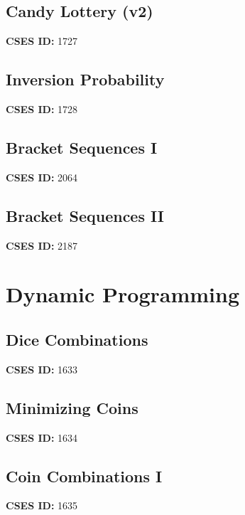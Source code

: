\documentclass[10pt, a4paper, twocolumn, landscape]{article}
\begin{document}
\subsection{Candy Lottery (v2)}
\textbf{CSES ID:} 1727 \\

\vspace{0.2cm}
\subsection{Inversion Probability}
\textbf{CSES ID:} 1728 \\

\vspace{0.2cm}
\subsection{Bracket Sequences I}
\textbf{CSES ID:} 2064 \\

\vspace{0.2cm}
\subsection{Bracket Sequences II}
\textbf{CSES ID:} 2187 \\

\vspace{0.2cm}
\section{Dynamic Programming}
\subsection{Dice Combinations}
\textbf{CSES ID:} 1633 \\

\vspace{0.2cm}
\subsection{Minimizing Coins}
\textbf{CSES ID:} 1634 \\

\vspace{0.2cm}
\subsection{Coin Combinations I}
\textbf{CSES ID:} 1635 \\

\vspace{0.2cm}
\end{document}
